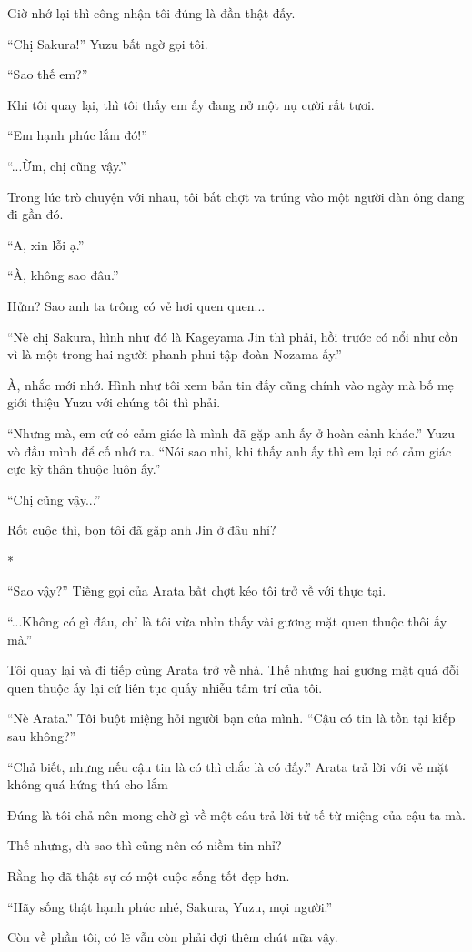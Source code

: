 {Giờ nhớ lại thì công nhận tôi đúng là đần thật đấy.

``Chị Sakura!'' Yuzu bất ngờ gọi tôi.

``Sao thế em?''

Khi tôi quay lại, thì tôi thấy em ấy đang nở một nụ cười rất tươi.

``Em hạnh phúc lắm đó!''

``...Ừm, chị cũng vậy.''

Trong lúc trò chuyện với nhau, tôi bất chợt va trúng vào một người đàn
ông đang đi gần đó.

``A, xin lỗi ạ.''

``À, không sao đâu.''

Hửm? Sao anh ta trông có vẻ hơi quen quen...

``Nè chị Sakura, hình như đó là Kageyama Jin thì phải, hồi trước có nổi
như cồn vì là một trong hai người phanh phui tập đoàn Nozama ấy.''

À, nhắc mới nhớ. Hình như tôi xem bản tin đấy cũng chính vào ngày mà bố
mẹ giới thiệu Yuzu với chúng tôi thì phải.

``Nhưng mà, em cứ có cảm giác là mình đã gặp anh ấy ở hoàn cảnh khác.''
Yuzu vò đầu mình để cố nhớ ra. ``Nói sao nhỉ, khi thấy anh ấy thì em lại
có cảm giác cực kỳ thân thuộc luôn ấy.''

``Chị cũng vậy...''

Rốt cuộc thì, bọn tôi đã gặp anh Jin ở đâu nhỉ?

*

``Sao vậy?'' Tiếng gọi của Arata bất chợt kéo tôi trở về với thực tại.

``...Không có gì đâu, chỉ là tôi vừa nhìn thấy vài gương mặt quen thuộc
thôi ấy mà.''

Tôi quay lại và đi tiếp cùng Arata trở về nhà. Thế nhưng hai gương mặt
quá đỗi quen thuộc ấy lại cứ liên tục quấy nhiễu tâm trí của tôi.

``Nè Arata.'' Tôi buột miệng hỏi người bạn của mình. ``Cậu có tin là tồn
tại kiếp sau không?''

``Chả biết, nhưng nếu cậu tin là có thì chắc là có đấy.'' Arata trả lời
với vẻ mặt không quá hứng thú cho lắm

Đúng là tôi chả nên mong chờ gì về một câu trả lời tử tế từ miệng của
cậu ta mà.

Thế nhưng, dù sao thì cũng nên có niềm tin nhỉ?

Rằng họ đã thật sự có một cuộc sống tốt đẹp hơn.

``Hãy sống thật hạnh phúc nhé, Sakura, Yuzu, mọi người.''

Còn về phần tôi, có lẽ vẫn còn phải đợi thêm chút nữa vậy.
}